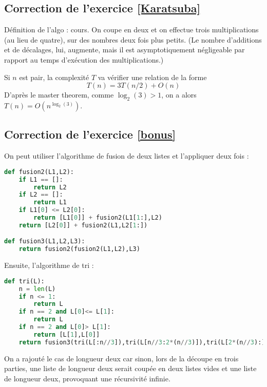 \documentclass[11pt,a4paper]{article}
\begin{document}
\subsection*{Correction de l'exercice \ref{Karatsuba}}

Définition de l'algo : cours. On coupe en deux et on effectue trois multiplications (au lieu de quatre), sur des nombres deux fois plus petits. (Le nombre d'additions et de décalages, lui, augmente, mais il est asymptotiquement négligeable par rapport au temps d'exécution des multiplications.)

Si $n$ est pair, la complexité $T$ va vérifier une relation de la forme
\[ T(n) = 3T(n/2)+O(n)\]
D'après le \og master theorem\fg, comme $\log_2(3)>1$, on a alors $T(n) = O\left(n^{\log_2(3)}\right)$.

\subsection*{Correction de l'exercice \ref{bonus}}

On peut utiliser l'algorithme de fusion de deux listes et l'appliquer deux fois :

\begin{lstlisting}[language=Python]
def fusion2(L1,L2):
	if L1 == []:
		return L2
	if L2 == []:
		return L1
	if L1[0] <= L2[0]:
		return [L1[0]] + fusion2(L1[1:],L2)
	return [L2[0]] + fusion2(L1,L2[1:])

def fusion3(L1,L2,L3):
	return fusion2(fusion2(L1,L2),L3)
\end{lstlisting}

Ensuite, l'algorithme de tri :
\begin{lstlisting}[language=Python]
def tri(L):
	n = len(L)
	if n <= 1:
		return L
	if n == 2 and L[0]<= L[1]:
		return L
	if n == 2 and L[0]> L[1]:
		return [L[1],L[0]]
	return fusion3(tri(L[:n//3]),tri(L[n//3:2*(n//3)]),tri(L[2*(n//3):]))
\end{lstlisting}
On a rajouté le cas de longueur deux car sinon, lors de la découpe en trois parties, une liste de longueur deux serait coupée en deux listes vides et une liste de longueur deux, provoquant une récursivité infinie.
\end{document}
